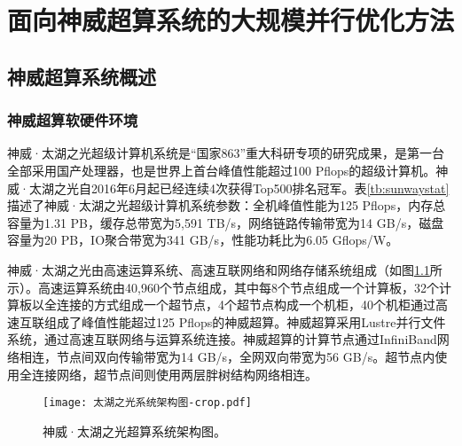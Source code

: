 \chapter{面向神威超算系统的大规模并行优化方法} %
\label{cha:面向神威超算系统的大规模并行优化方法}

\section{神威超算系统概述} %
\label{sec:神威超算系统概述}

\subsection{神威超算软硬件环境}
\label{sub:神威超算软硬件环境}
神威·太湖之光超级计算机系统是“国家863”重大科研专项的研究成果，是第一台全部采用国产处理器，也是世界上首台峰值性能超过100 Pflops的超级计算机。神威·太湖之光自2016年6月起已经连续4次获得Top500排名冠军。表\ref{tb:sunwaystat}描述了神威·太湖之光超级计算机系统参数：全机峰值性能为125 Pflops，内存总容量为1.31 PB，缓存总带宽为5,591 TB/s，网络链路传输带宽为14 GB/s，磁盘容量为20 PB，IO聚合带宽为341 GB/s，性能功耗比为6.05 Gflops/W。

\begin{table}[ht]
\centering
\caption{神威·太湖之光超级计算机系统基础参数}
\label{tb:sunwaystat}
\end{table}

神威·太湖之光由高速运算系统、高速互联网络和网络存储系统组成（如图\ref{fig:sunwayarch}所示）。高速运算系统由40,960个节点组成，其中每8个节点组成一个计算板，32个计算板以全连接的方式组成一个超节点，4个超节点构成一个机柜，40个机柜通过高速互联组成了峰值性能超过125 Pflops的神威超算。神威超算采用Lustre并行文件系统，通过高速互联网络与运算系统连接。神威超算的计算节点通过InfiniBand网络相连，节点间双向传输带宽为14 GB/s，全网双向带宽为56 GB/s。超节点内使用全连接网络，超节点间则使用两层胖树结构网络相连。

\begin{figure}[ht]
\centering
\texttt{[image: 太湖之光系统架构图-crop.pdf]}
\caption{神威·太湖之光超算系统架构图。}
\label{fig:sunwayarch}
\end{figure}

